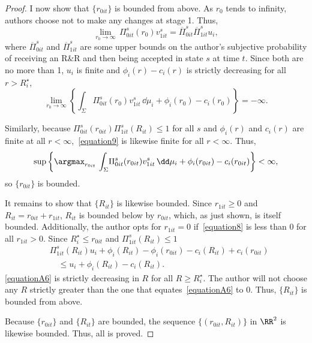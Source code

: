 \begin{proof}
I now show that $\{r_{0it}\}$ is bounded from above. As $r_{0}$ tends to infinity, authors choose not to make any changes at stage 1. Thus,
\begin{equation}\label{equationA4}
	\lim_{r_0\rightarrow\infty}\,\Pi_{0it}^s(r_0)v_{1it}^s=\overline\Pi_{0it}^s\overline\Pi_{1it}^s u_i,
\end{equation}
where $\overline\Pi_{0it}^s$ and $\overline\Pi_{1it}^s$ are some upper bounds on the author's subjective probability of receiving an R\&R and then being accepted in state $s$ at time $t$. Since both are no more than 1, $u_i$ is finite and $\phi_i(r)-c_i(r)$ is strictly decreasing for all $r>R_i^\star$,
\begin{equation}\label{equationA5}
	\lim_{r_0\rightarrow\infty}\left\{\int_\Sigma\!\Pi_{0it}^s(r_0)v_{1it}^s\,\dd\mu_i+\phi_i(r_0)-c_i(r_0)\right\}=-\infty.
\end{equation}

Similarly, because $\Pi_{0it}^s(r_{0it})\Pi_{1it}^s(R_{it})\le1$ for all $s$ and $\phi_i(r)$ and $c_i(r)$ are finite at all $r<\infty$,~\autoref{equation9} is likewise finite for all $r<\infty$. Thus,
\begin{equation*}
	\sup\left\{\argmax_{r_{0it}}\,\int_\Sigma\!\Pi_{0it}^s(r_{0it})v_{1it}^s\,\dd\mu_i+\phi_i(r_{0it})-c_i(r_{0it})\right\}<\infty,
\end{equation*}
so $\{r_{0it}\}$ is bounded.

It remains to show that $\{R_{it}\}$ is likewise bounded. Since $r_{1it}\ge0$ and $R_{it}=r_{0it}+r_{1it}$, $R_{it}$ is bounded below by $r_{0it}$, which, as just shown, is itself bounded. Additionally, the author opts for $r_{1it}=0$ if~\autoref{equation8} is less than 0 for all $r_{1it}>0$. Since $R_i^\star\le r_{0it}$ and $\Pi_{1it}^s(R_{it})\le1$
\begin{align}\label{equationA6}
&\Pi_{1it}^s(R_{it})u_i+\phi_i(R_{it})-\phi_i(r_{0it})-c_i(R_{it})+c_i(r_{0it})\nonumber\\
&\quad\le u_i+\phi_i(R_{it})-c_i(R_{it}).
\end{align}
\autoref{equationA6} is strictly decreasing in $R$ for all $R\ge R_i^\star$. The author will not choose any $R$ strictly greater than the one that equates~\autoref{equationA6} to 0. Thus, $\{R_{it}\}$ is bounded from above.

Because $\{r_{0it}\}$ and $\{R_{it}\}$ are bounded, the sequence $\{(r_{0it},R_{it})\}$ in $\RR^2$ is likewise bounded. Thus, all is proved.
\end{proof}

